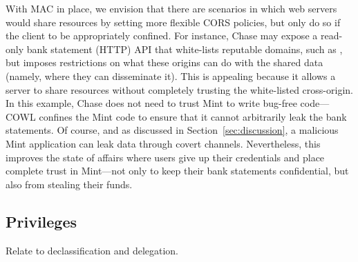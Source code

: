 With MAC in place, we envision that there are scenarios in which web
servers would share resources by setting more flexible CORS policies, but
only do so if the client to be appropriately confined.
%
For instance, Chase may expose a read-only bank statement (HTTP) API
that white-lists reputable domains, such as , but
imposes restrictions on what these origins can do with the shared data
(namely, where they can disseminate it).
%
This is appealing because it allows a server to share resources without
completely trusting the white-listed cross-origin.
%
In this example, Chase does not need to trust Mint to write bug-free
code---COWL confines the Mint code to ensure that it cannot arbitrarily
leak the bank statements.
%
Of course, and as discussed in Section~\ref{sec:discussion}, a malicious
Mint application can leak data through covert channels.
%
Nevertheless, this improves the state of affairs where users give up
their credentials and place complete trust in Mint---not only to keep
their bank statements confidential, but also from stealing their
funds.


\subsection{Privileges}
\label{sec:system:privileges}
Relate to declassification and delegation.






